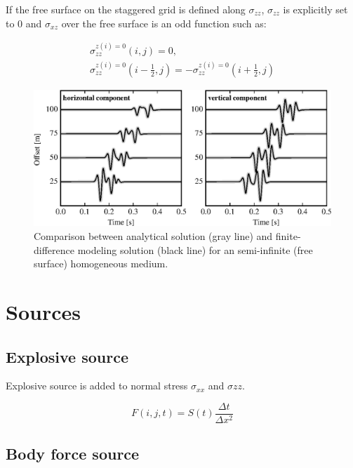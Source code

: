 \documentclass{gnulike}
\begin{document}
\noindent If the free surface on the staggered grid is defined along $\sigma_{zz}$, $\sigma_{zz}$ is explicitly set to $0$ and $\sigma_{xz}$ over the free surface is an odd function such as:

\begin{eqnarray}
  \sigma_{zz}^{z(i)=0}(i,j) = 0, \nonumber \\
  \sigma_{zz}^{z(i)=0}(i-\frac{1}{2},j) = -\sigma_{zz}^{z(i)=0}(i+\frac{1}{2},j)
\end{eqnarray}

\begin{figure}[!ht]
  \centering
  \includegraphics[width=0.9\columnwidth]{fig/validation_trac_fsurf.eps}
  \caption{Comparison between analytical solution (gray line) and finite-difference modeling solution (black line) for an semi-infinite (free surface) homogeneous medium.}
  \label{fig:validation_trac_fsurf}
\end{figure}

\section{Sources}

\subsection{Explosive source}

\noindent Explosive source is added to normal stress $\sigma_{xx}$ and $\sigma{zz}$.

\begin{equation}
  F(i,j,t) = S(t)\frac{\Delta t}{\Delta x^{2}}
\end{equation}

\subsection{Body force source}
\end{document}
